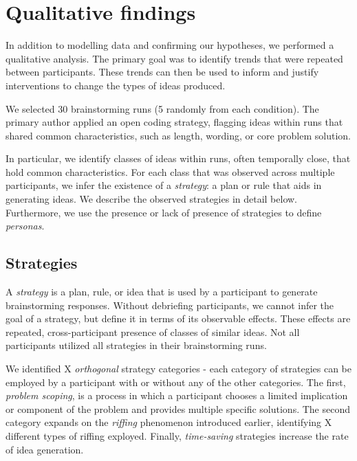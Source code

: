 \section{Qualitative findings}

In addition to modelling data and confirming our hypotheses, we performed a qualitative analysis. The primary goal was to identify trends  that were repeated between participants. These trends can then be used to inform and justify interventions to change the types of ideas produced.

We selected 30 brainstorming runs (5 randomly from each condition). The primary author applied an open coding strategy, flagging ideas within runs that shared common characteristics, such as length, wording, or core problem solution.

In particular, we identify classes of ideas within runs, often temporally close, that hold common characteristics. For each class that was observed across multiple participants, we infer the existence of a \emph{strategy}: a plan or rule that aids in generating ideas. We describe the observed strategies in detail below.
Furthermore, we use the presence or lack of presence of strategies to define \emph{personas}.

\subsection{Strategies}

A \emph{strategy} is a plan, rule, or idea that is used by a participant to generate brainstorming responses.
Without debriefing participants, we cannot infer the goal of a strategy, but define it in terms of its observable effects.
These effects are repeated, cross-participant presence of classes of similar ideas.
Not all participants utilized all strategies in their brainstorming runs.

We identified X \emph{orthogonal} strategy categories - each category of strategies can be employed by a participant with or without any of the other categories.
The first, \emph{problem scoping}, is a process in which a participant chooses a limited implication or component of the problem and provides multiple specific solutions.
The second category expands on the \emph{riffing} phenomenon introduced earlier, identifying X different types of riffing exployed.
Finally, \emph{time-saving} strategies increase the rate of idea generation.

